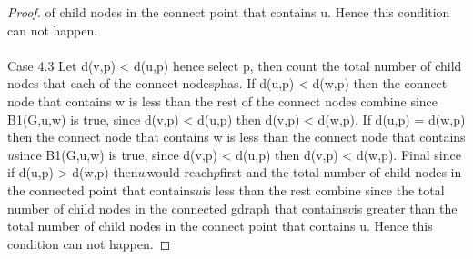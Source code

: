 \documentclass{article}
\begin{document}
\begin{proof}
of child nodes in the connect point that contains u. Hence this condition can not happen. 
\\\\
Case 4.3 Let d(v,p) < d(u,p) hence select p, then count the total number of child nodes 
that each of the connect nodes\(p\)has. If d(u,p) < d(w,p) then the connect node that contains 
w is less than the rest of the connect nodes combine since B1(G,u,w) is true, since d(v,p) < d(u,p) 
then d(v,p) < d(w,p). If d(u,p) = d(w,p) then the connect node that contains 
w is less than the connect node that contains\(u\)since B1(G,u,w) is true, since d(v,p) < d(u,p) 
then d(v,p) < d(w,p). Final since if d(u,p) > d(w,p) then\(w\)would reach\(p\)first and 
the total number of child nodes in the connected point that contains\(u\)is less than the 
rest combine since the total number of child nodes in the connected gdraph that contains\(v\)is greater than the total number 
of child nodes in the connect point that contains u. Hence this condition can not happen. 
\end{proof}
\end{document}
